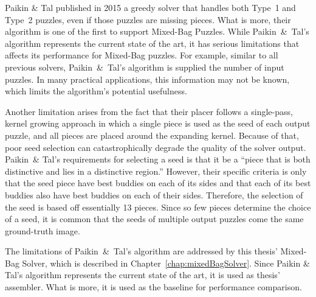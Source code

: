 Paikin \& Tal \cite{paikin2015} published in 2015 a greedy solver that handles both Type~1 and Type~2 puzzles, even if those puzzles are missing pieces.  What is more, their algorithm is one of the first to support Mixed-Bag Puzzles.  While Paikin~\&~Tal's algorithm represents the current state of the art, it has serious limitations that affects its performance for Mixed-Bag puzzles.  For example, similar to all previous solvers, Paikin~\&~Tal's algorithm is supplied the number of input puzzles.  In many practical applications, this information may not be known, which limits the algorithm's potential usefulness.

Another limitation arises from the fact that their placer follows a single-pass, kernel growing approach in which a single piece is used as the seed of each output puzzle, and all pieces are placed around the expanding kernel.  Because of that, poor seed selection can catastrophically degrade the quality of the solver output.  Paikin~\& Tal's requirements for selecting a seed is that it be a ``piece that is both distinctive and lies in a distinctive region.'' However, their specific criteria is only that the seed piece have best buddies on each of its sides and that each of its best buddies also have best buddies on each of their sides.  Therefore, the selection of the seed is based off essentially 13 pieces.  Since so few pieces determine the choice of a seed, it is common that the seeds of multiple output puzzles come the same ground-truth image.

The limitations of Paikin~\&~Tal's algorithm are addressed by this thesis' Mixed-Bag Solver, which is described in Chapter~\ref{chap:mixedBagSolver}.  Since Paikin \&  Tal's algorithm represents the current state of the art, it is used as thesis' assembler.  What is more, it is used as the baseline for performance comparison. 